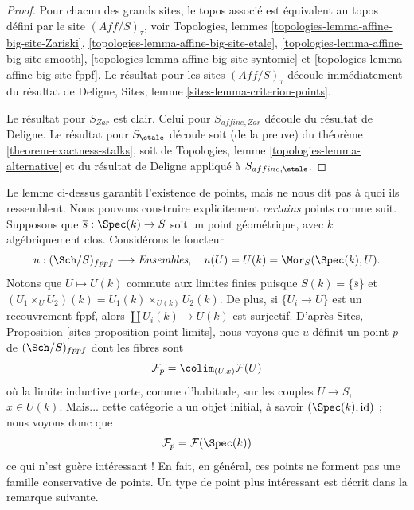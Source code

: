 \begin{proof}
Pour chacun des grands sites, le topos associ\'e est \'equivalent au
topos d\'efini par le site $(\textit{Aff}/S)_\tau$, voir
Topologies, lemmes \ref{topologies-lemma-affine-big-site-Zariski},
\ref{topologies-lemma-affine-big-site-etale},
\ref{topologies-lemma-affine-big-site-smooth},
\ref{topologies-lemma-affine-big-site-syntomic} et
\ref{topologies-lemma-affine-big-site-fppf}.
Le r\'esultat pour les sites $(\textit{Aff}/S)_\tau$ d\'ecoule imm\'ediatement
du r\'esultat de Deligne,
Sites, lemme \ref{sites-lemma-criterion-points}.

\medskip\noindent
Le r\'esultat pour $S_{Zar}$ est clair. Celui pour $S_{affine, Zar}$
d\'ecoule du r\'esultat de Deligne. Le r\'esultat pour $S_\etale$
d\'ecoule soit (de la preuve) du
th\'eor\`eme \ref{theorem-exactness-stalks},
soit de Topologies, lemme \ref{topologies-lemma-alternative}
et du r\'esultat de Deligne appliqu\'e \`a $S_{affine, \etale}$.
\end{proof}

\noindent
Le lemme ci-dessus garantit l'existence de points, mais ne nous
dit pas \`a quoi ils ressemblent. Nous pouvons construire explicitement
{\it certains} points comme suit.
Supposons que $\overline{s} : \Spec(k) \to S$ soit un point
g\'eom\'etrique, avec $k$ alg\'ebriquement clos. Consid\'erons le foncteur
$$
u : (\Sch/S)_{fppf} \longrightarrow \textit{Ensembles},
\quad
u(U) = U(k) = \Mor_S(\Spec(k), U).
$$
Notons que $U \mapsto U(k)$ commute aux limites finies puisque
$S(k) = \{\overline{s}\}$ et
$(U_1 \times_U U_2)(k) = U_1(k) \times_{U(k)} U_2(k)$.
De plus, si $\{U_i \to U\}$ est un recouvrement fppf, alors
$\coprod U_i(k) \to U(k)$ est surjectif.
D'apr\`es
Sites, Proposition \ref{sites-proposition-point-limits},
nous voyons que $u$ d\'efinit un point $p$ de $(\Sch/S)_{fppf}$ dont les
fibres sont
$$
\mathcal{F}_p = \colim_{(U, x)} \mathcal{F}(U)
$$
o\`u la limite inductive porte, comme d'habitude, sur les couples $U \to S$, $x \in U(k)$.
Mais... cette cat\'egorie a un objet initial, \`a savoir
$(\Spec(k), \text{id})$ ; nous voyons donc que
$$
\mathcal{F}_p = \mathcal{F}(\Spec(k))
$$
ce qui n'est gu\`ere int\'eressant ! En fait, en g\'en\'eral, ces points ne
forment pas une famille conservative de points. Un type de point plus int\'eressant
est d\'ecrit dans la remarque suivante.

